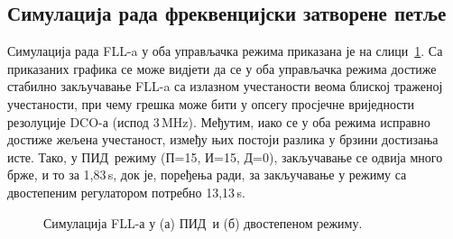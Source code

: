 \documentclass[master]{finthesis}
\def \FLL  {FLL} %
\def \DCO  {DCO} %
\def \PID  {ПИД} %
\def \P    {П}   %
\def \I    {И}   %
\def \D    {Д}   %
\begin{document}
\subsection{Симулација рада фреквенцијски затворене петље}
Симулација рада \FLL-a у оба управљачка режима приказана је на слици~\ref{sim_FLL}. Са приказаних графика се може видјети да се у оба управљачка режима достиже стабилно закључавање \FLL-a са излазном учестаности веома блиској траженој учестаности, при чему грешка може бити у опсегу просјечне вриједности резолуције \DCO-а (испод 3\,MHz). Међутим, иако се у оба режима исправно достиже жељена учестаност, између њих постоји разлика у брзини достизања исте. Тако, у \PID\ режиму (\P=15, \I=15, \D=0), закључавање се одвија много брже, и то за 1,83\,\textmu s, док је, поређења ради, за закључавање у режиму са двостепеним регулатором потребно 13,13\,\textmu s.
\begin{figure}[!ht]
    \centering
    \subfloat[]{
	    
    }
    \vspace{0.2cm}
    \subfloat[]{		
	    \hspace{-0.2cm}
	    
    }	
    \caption {Симулација \FLL-а у (а) \PID\ и (б) двостепеном режиму.} %
    \label{sim_FLL}
\end{figure}
\end{document}
